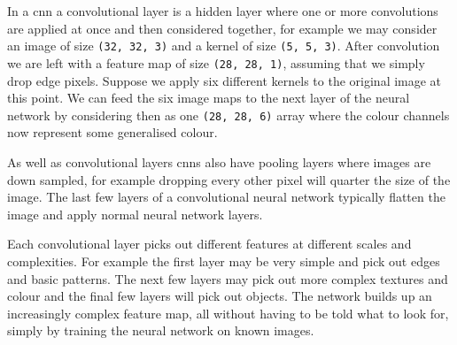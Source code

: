 \documentclass[a4paper]{article}
\begin{document}
    In a \gls{cnn} a convolutional layer is a hidden layer where one or more convolutions are applied at once and then considered together, for example we may consider an image of size \lstinline|(32, 32, 3)| and a kernel of size \lstinline|(5, 5, 3)|.
    After convolution we are left with a feature map of size \lstinline|(28, 28, 1)|, assuming that we simply drop edge pixels.
    Suppose we apply six different kernels to the original image at this point.
    We can feed the six image maps to the next layer of the neural network by considering then as one \lstinline|(28, 28, 6)| array where the colour channels now represent some generalised colour.
    
    As well as convolutional layers \glspl{cnn} also have pooling layers where images are down sampled, for example dropping every other pixel will quarter the size of the image.
    The last few layers of a convolutional neural network typically flatten the image and apply normal neural network layers.
    
    Each convolutional layer picks out different features at different scales and complexities.
    For example the first layer may be very simple and pick out edges and basic patterns.
    The next few layers may pick out more complex textures and colour and the final few layers will pick out objects.
    The network builds up an increasingly complex feature map, all without having to be told what to look for, simply by training the neural network on known images.
    
\end{document}
